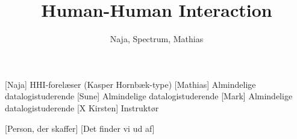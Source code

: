 \documentclass[a4paper,11pt]{article}
\title{Human-Human Interaction}
\author{Naja, Spectrum, Mathias}
\begin{document}
  \maketitle

  \begin{roles}
    [Naja] HHI-forelæser (Kasper Hornbæk-type)
    [Mathias] Almindelige datalogistuderende
    [Sune] Almindelige datalogistuderende
    [Mark] Almindelige datalogistuderende
    [X Kirsten] Instruktør
  \end{roles}

  \begin{props}
    [Person, der skaffer]
    [Det finder vi ud af]
  \end{props}
\end{document}
